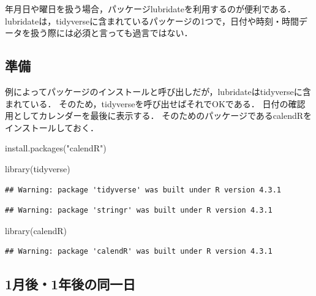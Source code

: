 \documentclass[
]{article}
\newenvironment{Shaded}{\begin{snugshade}}{\end{snugshade}}
\newcommand{\FunctionTok}[1]{\textcolor[rgb]{0.00,0.00,0.00}{#1}}
\newcommand{\NormalTok}[1]{#1}
\newcommand{\StringTok}[1]{\textcolor[rgb]{0.31,0.60,0.02}{#1}}
\begin{document}
年月日や曜日を扱う場合，パッケージlubridateを利用するのが便利である．
lubridateは，tidyverseに含まれているパッケージの1つで，日付や時刻・時間データを扱う際には必須と言っても過言ではない．

\hypertarget{ux6e96ux5099-3}{%
\subsection{準備}\label{ux6e96ux5099-3}}

例によってパッケージのインストールと呼び出しだが，lubridateはtidyverseに含まれている．
そのため，tidyverseを呼び出せばそれでOKである．
日付の確認用としてカレンダーを最後に表示する．
そのためのパッケージであるcalendRをインストールしておく．

\begin{Shaded}
\begin{Highlighting}[]
\FunctionTok{install.packages}\NormalTok{(}\StringTok{"calendR"}\NormalTok{)}
\end{Highlighting}
\end{Shaded}

\begin{Shaded}
\begin{Highlighting}[]
\FunctionTok{library}\NormalTok{(tidyverse)}
\end{Highlighting}
\end{Shaded}

\begin{verbatim}
## Warning: package 'tidyverse' was built under R version 4.3.1
\end{verbatim}

\begin{verbatim}
## Warning: package 'stringr' was built under R version 4.3.1
\end{verbatim}

\begin{Shaded}
\begin{Highlighting}[]
\FunctionTok{library}\NormalTok{(calendR)}
\end{Highlighting}
\end{Shaded}

\begin{verbatim}
## Warning: package 'calendR' was built under R version 4.3.1
\end{verbatim}

\hypertarget{ux6708ux5f8c1ux5e74ux5f8cux306eux540cux4e00ux65e5}{%
\subsection{1月後・1年後の同一日}\label{ux6708ux5f8c1ux5e74ux5f8cux306eux540cux4e00ux65e5}}
\end{document}
